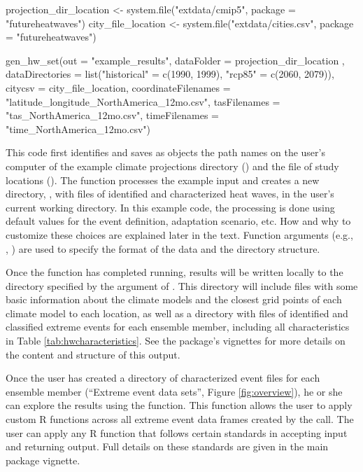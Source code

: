 \begin{Schunk}
\begin{Sinput}
projection_dir_location <- system.file("extdata/cmip5",
                                       package = "futureheatwaves")
city_file_location <- system.file("extdata/cities.csv",
                                  package = "futureheatwaves")

gen_hw_set(out = "example_results",
           dataFolder = projection_dir_location ,
           dataDirectories = list("historical" = c(1990, 1999),
                                        "rcp85" = c(2060, 2079)),
           citycsv = city_file_location,
           coordinateFilenames = "latitude_longitude_NorthAmerica_12mo.csv",
           tasFilenames = "tas_NorthAmerica_12mo.csv",
           timeFilenames = "time_NorthAmerica_12mo.csv")
\end{Sinput}
\end{Schunk}

This code first identifies and saves as objects the path names on the
user's computer of the example climate projections directory
() and the file of study locations
(). The  function
processes the example input and creates a new directory,
, with files of identified and characterized heat
waves, in the user's current working directory. In this example code,
the processing is done using default values for the event definition,
adaptation scenario, etc. How and why to customize these choices are
explained later in the text. Function arguments (e.g.,
, ) are used to specify the
format of the data and the directory structure.

Once the function has completed running, results will be written locally
to the directory specified by the  argument of
. This directory will include files with some basic
information about the climate models and the closest grid points of each
climate model to each location, as well as a directory with files of
identified and classified extreme events for each ensemble member,
including all characteristics in Table \ref{tab:hwcharacteristics}. See
the package's vignettes for more details on the content and structure of
this output.

Once the user has created a directory of characterized event files for
each ensemble member (``Extreme event data sets'', Figure
\ref{fig:overview}), he or she can explore the results using the
 function. This function allows the user to
apply custom R functions across all extreme event data frames created by
the  call. The user can apply any R function that
follows certain standards in accepting input and returning output. Full
details on these standards are given in the main package vignette.

